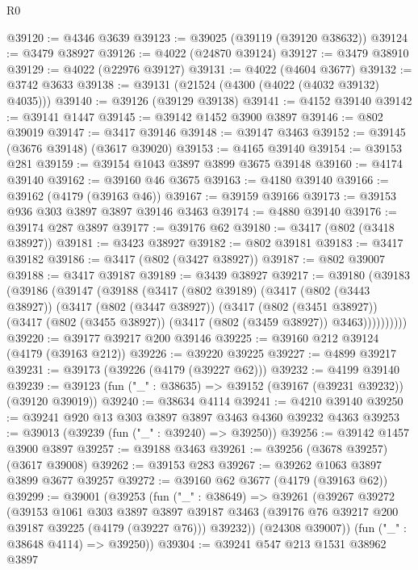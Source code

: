 \begin{lexlean}{R0}
\begin{coremodule}
@39120 := @4346 @3639
@39123 := @39025 (@39119 (@39120 @38632))
@39124 := @3479 @38927
@39126 := @4022 (@24870 @39124)
@39127 := @3479 @38910
@39129 := @4022 (@22976 @39127)
@39131 := @4022 (@4604 @3677)
@39132 := @3742 @3633
@39138 := @39131 (@21524 (@4300 (@4022 (@4032 @39132) @4035)))
@39140 := @39126 (@39129 @39138)
@39141 := @4152 @39140
@39142 := @39141 @1447
@39145 := @39142 @1452 @3900 @3897
@39146 := @802 @39019
@39147 := @3417 @39146
@39148 := @39147 @3463
@39152 := @39145 (@3676 @39148) (@3617 @39020)
@39153 := @4165 @39140
@39154 := @39153 @281
@39159 := @39154 @1043 @3897 @3899 @3675 @39148
@39160 := @4174 @39140
@39162 := @39160 @46 @3675
@39163 := @4180 @39140
@39166 := @39162 (@4179 (@39163 @46))
@39167 := @39159 @39166
@39173 := @39153 @936 @303 @3897 @3897 @39146 @3463
@39174 := @4880 @39140
@39176 := @39174 @287 @3897
@39177 := @39176 @62
@39180 := @3417 (@802 (@3418 @38927))
@39181 := @3423 @38927
@39182 := @802 @39181
@39183 := @3417 @39182
@39186 := @3417 (@802 (@3427 @38927))
@39187 := @802 @39007
@39188 := @3417 @39187
@39189 := @3439 @38927
@39217 := @39180
    (@39183
      (@39186
        (@39147
          (@39188
            (@3417
              (@802 @39189)
              (@3417
                (@802 (@3443 @38927))
                (@3417
                  (@802 (@3447 @38927))
                  (@3417
                    (@802 (@3451 @38927))
                    (@3417 (@802 (@3455 @38927)) (@3417 (@802 (@3459 @38927)) @3463))))))))))
@39220 := @39177 @39217 @200 @39146
@39225 := @39160 @212 @39124 (@4179 (@39163 @212))
@39226 := @39220 @39225
@39227 := @4899 @39217
@39231 := @39173 (@39226 (@4179 (@39227 @62)))
@39232 := @4199 @39140
@39239 := @39123 (fun ("_" : @38635) => @39152 (@39167 (@39231 @39232)) (@39120 @39019))
@39240 := @38634 @4114
@39241 := @4210 @39140
@39250 := @39241 @920 @13 @303 @3897 @3897 @3463 @4360 @39232 @4363
@39253 := @39013 (@39239 (fun ("_" : @39240) => @39250))
@39256 := @39142 @1457 @3900 @3897
@39257 := @39188 @3463
@39261 := @39256 (@3678 @39257) (@3617 @39008)
@39262 := @39153 @283
@39267 := @39262 @1063 @3897 @3899 @3677 @39257
@39272 := @39160 @62 @3677 (@4179 (@39163 @62))
@39299 := @39001
    (@39253
      (fun ("_" : @38649) =>
      @39261
        (@39267
          @39272
          (@39153
            @1061
            @303
            @3897
            @3897
            @39187
            @3463
            (@39176 @76 @39217 @200 @39187 @39225 (@4179 (@39227 @76)))
            @39232))
        (@24308 @39007))
      (fun ("_" : @38648 @4114) => @39250))
@39304 := @39241 @547 @213 @1531 @38962 @3897

\end{coremodule}
\end{lexlean}

